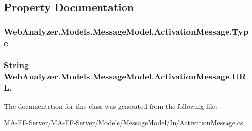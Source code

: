 \subsection{Property Documentation}
\hypertarget{class_web_analyzer_1_1_models_1_1_message_model_1_1_activation_message_a0f68201fb8faad6d3a2a074bc7670313}{}
\subsubsection[{Type}]{ Web\+Analyzer.\+Models.\+Message\+Model.\+Activation\+Message.\+Type\hspace{0.3cm}{\ttfamily [get]}}\label{class_web_analyzer_1_1_models_1_1_message_model_1_1_activation_message_a0f68201fb8faad6d3a2a074bc7670313}
\hypertarget{class_web_analyzer_1_1_models_1_1_message_model_1_1_activation_message_a4df0cf1fbf60a7211a5ee55831adcb9e}{}
\subsubsection[{U\+R\+L}]{\setlength{\rightskip}{0pt plus 5cm}String Web\+Analyzer.\+Models.\+Message\+Model.\+Activation\+Message.\+U\+R\+L\hspace{0.3cm}{\ttfamily [get]}, {\ttfamily [set]}}\label{class_web_analyzer_1_1_models_1_1_message_model_1_1_activation_message_a4df0cf1fbf60a7211a5ee55831adcb9e}


The documentation for this class was generated from the following file\+:\begin{DoxyCompactItemize}
\item 
M\+A-\/\+F\+F-\/\+Server/\+M\+A-\/\+F\+F-\/\+Server/\+Models/\+Message\+Model/\+In/\hyperlink{_activation_message_8cs}{Activation\+Message.\+cs}\end{DoxyCompactItemize}
